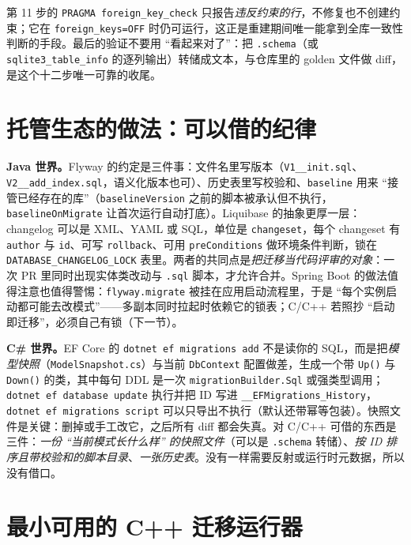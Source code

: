\documentclass[12pt,a4paper,fontset=fandol]{ctexbook}
\newcommand{\Fn}[1]{\texttt{#1()}}
\newcommand{\Tp}[1]{\texttt{#1}}
\newcommand{\CSharp}{C\#}
\newcommand{\CppJava}{C/C++}
\begin{document}
第 11 步的 \Tp{PRAGMA foreign\_key\_check} 只报告\emph{违反约束的行}，不修复也不创建约束；它在 \texttt{foreign\_keys=OFF} 时仍可运行，这正是重建期间唯一能拿到全库一致性判断的手段。最后的验证不要用 ``看起来对了''：把 \texttt{.schema}（或 \Tp{sqlite3\_table\_info} 的逐列输出）转储成文本，与仓库里的 golden 文件做 diff，是这个十二步唯一可靠的收尾。

\section{托管生态的做法：可以借的纪律}

\textbf{Java 世界。}Flyway 的约定是三件事：文件名里写版本（\Tp{V1\_\allowbreak{}\_\allowbreak{}init.sql}、\Tp{V2\_\allowbreak{}\_\allowbreak{}add\_\allowbreak{}index.sql}，语义化版本也可）、历史表里写校验和、\texttt{baseline} 用来 ``接管已经存在的库''（\Tp{baseline\allowbreak{}Version} 之前的脚本被承认但不执行，\Tp{baseline\allowbreak{}On\allowbreak{}Migrate} 让首次运行自动打底）。Liquibase 的抽象更厚一层：changelog 可以是 XML、YAML 或 SQL，单位是 \texttt{changeset}，每个 changeset 有 \texttt{author} 与 \texttt{id}、可写 \texttt{rollback}、可用 \texttt{pre\allowbreak{}Conditions} 做环境条件判断，锁在 \Tp{DATABASE\_\allowbreak{}\allowbreak CHANGELOG\_\allowbreak{}\allowbreak LOCK} 表里。两者的共同点是\emph{把迁移当代码评审的对象}：一次 PR 里同时出现实体类改动与 \texttt{.sql} 脚本，才允许合并。Spring Boot 的做法值得注意也值得警惕：\texttt{flyway.migrate} 被挂在应用启动流程里，于是 ``每个实例启动都可能去改模式''——多副本同时拉起时依赖它的锁表；\CppJava{} 若照抄 ``启动即迁移''，必须自己有锁（下一节）。

\textbf{\CSharp{} 世界。}EF Core 的 \Tp{dotnet ef migrations add} 不是读你的 SQL，而是把\emph{模型快照}（\Tp{ModelSnapshot.cs}）与当前 \Tp{DbContext} 配置做差，生成一个带 \Fn{Up} 与 \Fn{Down} 的类，其中每句 DDL 是一次 \texttt{migrationBuilder.Sql} 或强类型调用；\Tp{dotnet ef database update} 执行并把 ID 写进 \Tp{\_\_EFMigrations\_\allowbreak History}，\Tp{dotnet ef migrations script} 可以只导出不执行（默认还带幂等包装）。快照文件是关键：删掉或手工改它，之后所有 diff 都会失真。对 \CppJava{} 可借的东西是三件：\emph{一份 ``当前模式长什么样'' 的快照文件}（可以是 \texttt{.schema} 转储）、\emph{按 ID 排序且带校验和的脚本目录}、\emph{一张历史表}。没有一样需要反射或运行时元数据，所以没有借口。

\section{最小可用的 C++ 迁移运行器}
\end{document}
